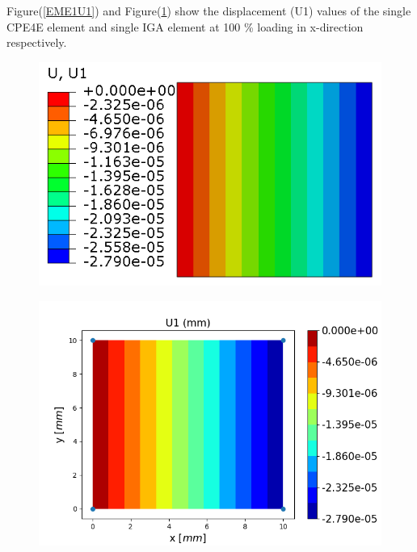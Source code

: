 \documentclass[11pt]{article}
\begin{document}
Figure(\ref{EME1U1}) and Figure(\ref{EME1U1_IGA}) show the displacement (U1) values of the single CPE4E element and single IGA element at 100 \% loading in x-direction respectively. \\
\begin{figure}[H]
	\centering
	\begin{minipage}{.5\textwidth}
		\centering
		\includegraphics[width=1\linewidth]{EME1U1.png}
		\label{EME1U1}
	\end{minipage}%
	\begin{minipage}{.55\textwidth}
		\centering
		\includegraphics[width=1\linewidth]{EME1U1_IGA.png}
		\label{EME1U1_IGA}
	\end{minipage}
\end{figure}
\end{document}

